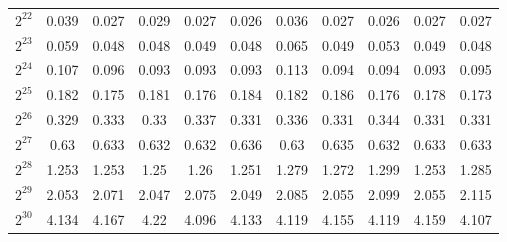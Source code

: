 \begin{center}
\begin{tabular}{c|c|c|c|c|c|c|c|c|c|c}
$2^{22}$ & 0.039 & 0.027 & 0.029 & 0.027 & 0.026 & 0.036 & 0.027 & 0.026 & 0.027 & 0.027 \\ 
$2^{23}$ & 0.059 & 0.048 & 0.048 & 0.049 & 0.048 & 0.065 & 0.049 & 0.053 & 0.049 & 0.048 \\ 
$2^{24}$ & 0.107 & 0.096 & 0.093 & 0.093 & 0.093 & 0.113 & 0.094 & 0.094 & 0.093 & 0.095 \\ 
$2^{25}$ & 0.182 & 0.175 & 0.181 & 0.176 & 0.184 & 0.182 & 0.186 & 0.176 & 0.178 & 0.173 \\ 
$2^{26}$ & 0.329 & 0.333 & 0.33 & 0.337 & 0.331 & 0.336 & 0.331 & 0.344 & 0.331 & 0.331 \\ 
$2^{27}$ & 0.63 & 0.633 & 0.632 & 0.632 & 0.636 & 0.63 & 0.635 & 0.632 & 0.633 & 0.633 \\ 
$2^{28}$ & 1.253 & 1.253 & 1.25 & 1.26 & 1.251 & 1.279 & 1.272 & 1.299 & 1.253 & 1.285 \\ 
$2^{29}$ & 2.053 & 2.071 & 2.047 & 2.075 & 2.049 & 2.085 & 2.055 & 2.099 & 2.055 & 2.115 \\ 
$2^{30}$ & 4.134 & 4.167 & 4.22 & 4.096 & 4.133 & 4.119 & 4.155 & 4.119 & 4.159 & 4.107 \\ 
\end{tabular}
\end{center}
